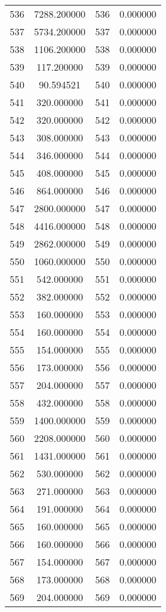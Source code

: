 \documentclass[12pt]{article}
\begin{document}
\begin{longtable}{@{}cccc@{}}
536 & 7288.200000 & 536 & 0.000000 \\
537 & 5734.200000 & 537 & 0.000000 \\
538 & 1106.200000 & 538 & 0.000000 \\
539 & 117.200000 & 539 & 0.000000 \\
540 & 90.594521 & 540 & 0.000000 \\
541 & 320.000000 & 541 & 0.000000 \\
542 & 320.000000 & 542 & 0.000000 \\
543 & 308.000000 & 543 & 0.000000 \\
544 & 346.000000 & 544 & 0.000000 \\
545 & 408.000000 & 545 & 0.000000 \\
546 & 864.000000 & 546 & 0.000000 \\
547 & 2800.000000 & 547 & 0.000000 \\
548 & 4416.000000 & 548 & 0.000000 \\
549 & 2862.000000 & 549 & 0.000000 \\
550 & 1060.000000 & 550 & 0.000000 \\
551 & 542.000000 & 551 & 0.000000 \\
552 & 382.000000 & 552 & 0.000000 \\
553 & 160.000000 & 553 & 0.000000 \\
554 & 160.000000 & 554 & 0.000000 \\
555 & 154.000000 & 555 & 0.000000 \\
556 & 173.000000 & 556 & 0.000000 \\
557 & 204.000000 & 557 & 0.000000 \\
558 & 432.000000 & 558 & 0.000000 \\
559 & 1400.000000 & 559 & 0.000000 \\
560 & 2208.000000 & 560 & 0.000000 \\
561 & 1431.000000 & 561 & 0.000000 \\
562 & 530.000000 & 562 & 0.000000 \\
563 & 271.000000 & 563 & 0.000000 \\
564 & 191.000000 & 564 & 0.000000 \\
565 & 160.000000 & 565 & 0.000000 \\
566 & 160.000000 & 566 & 0.000000 \\
567 & 154.000000 & 567 & 0.000000 \\
568 & 173.000000 & 568 & 0.000000 \\
569 & 204.000000 & 569 & 0.000000 \\

\end{longtable}
\end{document}

